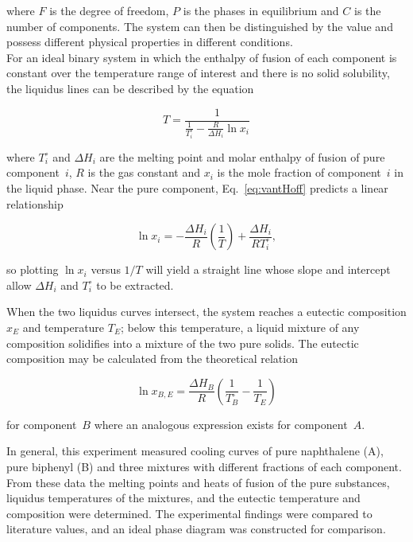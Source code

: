 \documentclass[12pt]{article}
\begin{document}
where $F$ is the degree of freedom, $P$ is the phases in equilibrium and $C$ is the number of components.\cite{lab_manual} The system can then be distinguished by the value and possess different physical properties in different conditions.
\\
For an ideal binary system in which the enthalpy of fusion of each component is constant over the temperature range of interest and there is no solid solubility, the liquidus lines can be described by the equation

\begin{equation}
T = \frac{1}{\frac{1}{T_i^{\circ}} - \frac{R}{\Delta H_i} \ln x_i}
\label{eq:vantHoff}
\end{equation}

where $T_i^{\circ}$ and $\Delta H_i$ are the melting point and molar enthalpy of fusion of pure component~$i$, $R$ is the gas constant and $x_i$ is the mole fraction of component~$i$ in the liquid phase.\cite{lab_manual} Near the pure component, Eq.~\ref{eq:vantHoff} predicts a linear relationship

\begin{equation}
\ln x_i = -\frac{\Delta H_i}{R}\left(\frac{1}{T}\right) + \frac{\Delta H_i}{R T_i^{\circ}},
\end{equation}

so plotting $\ln x_i$ versus $1/T$ will yield a straight line whose slope and intercept allow $\Delta H_i$ and $T_i^{\circ}$ to be extracted.

When the two liquidus curves intersect, the system reaches a eutectic composition $x_E$ and temperature $T_E$; below this temperature, a liquid mixture of any composition solidifies into a mixture of the two pure solids.  The eutectic composition may be calculated from the theoretical relation

\begin{equation}
\ln x_{B,E} = \frac{\Delta H_B}{R}\left(\frac{1}{T_B^{\circ}} - \frac{1}{T_E}\right)
\label{eq:eutectic}
\end{equation}

for component~$B$ where an analogous expression exists for component~$A$.\cite{lab_manual}

In general, this experiment measured cooling curves of pure naphthalene (A), pure biphenyl (B) and three mixtures with different fractions of each component. From these data the melting points and heats of fusion of the pure substances, liquidus temperatures of the mixtures, and the eutectic temperature and composition were determined. The experimental findings were compared to literature values\cite{gallus2001binary}, and an ideal phase diagram was constructed for comparison.
\end{document}
